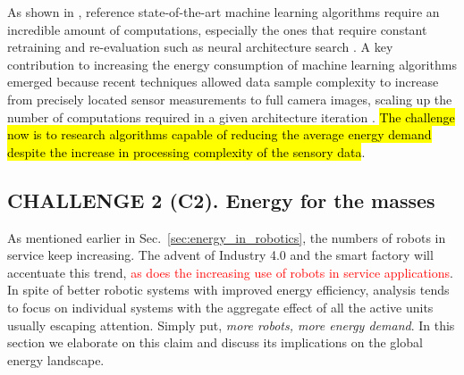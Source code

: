 As shown in \cite{Strubell2019EnergyAP}, reference state-of-the-art machine learning algorithms require an incredible amount of computations, especially the ones that require constant retraining and re-evaluation such as neural architecture search \cite{real2019regularized}. A key contribution to increasing the energy consumption of machine learning algorithms emerged because recent techniques allowed data sample complexity to increase from precisely located sensor measurements to full camera images, scaling up the number of computations required in a given architecture iteration \cite{krizhevsky2012imagenet}. \hl{The challenge now is to research algorithms capable of reducing the average energy demand despite the increase in processing complexity of the sensory data}.

\subsection{\textbf{CHALLENGE 2} (C2). Energy for the masses}\label{sec:robots_challenge}
As mentioned earlier in Sec.~\ref{sec:energy_in_robotics}, the numbers of robots in service keep increasing. The advent of Industry 4.0 and the smart factory will accentuate this trend, \textcolor{red}{as does the increasing use of robots in service applications}. In spite of better robotic systems with improved energy efficiency, analysis tends to focus on individual systems with the aggregate effect of all the active units usually escaping attention. Simply put, \emph{more robots, more energy demand}. In this section we elaborate on this claim and discuss its implications on the global energy landscape.

